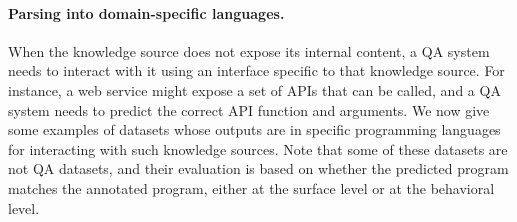 \paragraph{Parsing into domain-specific languages.}

When the knowledge source does not expose its internal content,
a QA system needs to interact with it using an interface
specific to that knowledge source.
For instance, a web service might expose a set of APIs
that can be called,
and a QA system needs to predict the correct API function
and arguments.
We now give some examples of datasets whose outputs
are in specific programming languages
for interacting with such knowledge sources.
Note that some of these datasets are not QA datasets,
and their evaluation is based on whether the predicted program
matches the annotated program, either at the surface level
or at the behavioral level.

